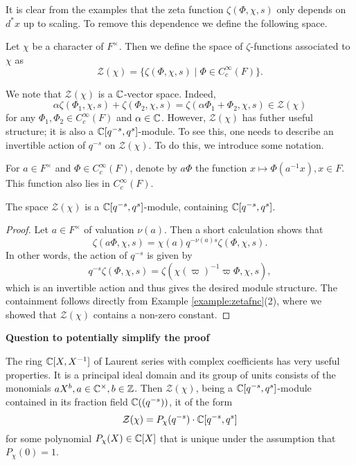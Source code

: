It is clear from the examples that the zeta function $\zeta(\Phi,\chi,s)$ only depends on $d^*x$ up to scaling. To remove this dependence we define the following space.

\begin{defn}
    Let $\chi$ be a character of $F^\times$. Then we define the space of $\zeta$-functions associated to $\chi$ as
    $$\mathcal Z(\chi) = \{\zeta(\Phi,\chi,s) \mid \Phi \in C_c^\infty(F)\}.$$
\end{defn}

We note that $\mathcal{Z}(\chi)$ is a $\mathbb{C}$-vector space. Indeed, $$\alpha\zeta(\Phi_1,\chi,s)+\zeta(\Phi_2,\chi,s)=\zeta(\alpha\Phi_1+\Phi_2,\chi,s)\in\mathcal{Z}(\chi)$$
for any $\Phi_1,\Phi_2\in C_c^\infty(F)$ and $\alpha\in\mathbb{C}$. However, $\mathcal{Z}(\chi)$ has futher useful structure; it is also a $\mathbb{C}[q^{-s},q^s]$-module. To see this, one needs to describe an invertible action of $q^{-s}$ on $\mathcal{Z}(\chi)$. To do this, we introduce some notation.

\begin{notn}
    For $a \in F^\times$ and $\Phi \in C_c^\infty(F)$, denote by $a\Phi$ the function $x \mapsto \Phi(a^{-1}x),x\in F$. This function also lies in $C_c^\infty(F)$.
\end{notn}

\begin{lemma}\label{lem:ZmodGL1}
    The space $\mathcal Z(\chi)$ is a $\mathbb{C}[q^{-s},q^s]$-module, containing $\mathbb{C}[q^{-s},q^s]$.
\end{lemma}
\begin{proof}
    Let $a \in F^\times$ of valuation $\nu(a)$. Then a short calculation shows that
    $$\zeta(a\Phi,\chi,s) = \chi(a)q^{-\nu(a)s}\zeta(\Phi,\chi,s).$$
    In other words, the action of $q^{-s}$ is given by 
    $$q^{-s}\zeta(\Phi,\chi,s)=\zeta(\chi(\varpi)^{-1}\varpi\Phi,\chi,s),$$
    which is an invertible action and thus gives the desired module structure. The containment follows directly from Example \ref{example:zetafnc}(2), where we showed that $\mathcal{Z}(\chi)$ contains a non-zero constant.
\end{proof}

\iffalse
\textbf{Question to potentially simplify the proof}

The ring $\mathbb{C}[X,X^{-1}]$ of Laurent series with complex coefficients has very useful properties. It is a principal ideal domain and its group of units consists of the monomials $aX^b,a\in\mathbb{C}^\times, b\in\mathbb{Z}$. Then $\mathcal Z(\chi)$, being a $\mathbb{C}[q^{-s},q^s]$-module contained in its fraction field $\mathbb{C}((q^{-s}))$, it of the form 
$$\mathcal{Z}(\chi)=P_\chi(q^{-s})\cdot\mathbb{C}[q^{-s},q^s]$$ for some polynomial $P_\chi(X)\in\mathbb{C}[X]$ that is unique under the assumption that $P_\chi(0)=1$.

